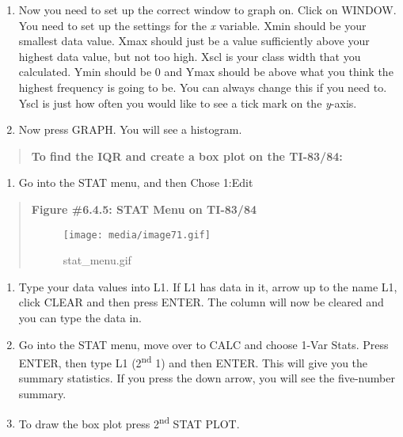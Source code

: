 \documentclass[]{book}
\providecommand{\tightlist}{%
  \setlength{\itemsep}{0pt}\setlength{\parskip}{0pt}}
\begin{document}
\begin{enumerate}
\def\labelenumi{\arabic{enumi}.}
\setcounter{enumi}{7}
\item
  Now you need to set up the correct window to graph on. Click on
  WINDOW. You need to set up the settings for the \emph{x} variable. Xmin
  should be your smallest data value. Xmax should just be a value
  sufficiently above your highest data value, but not too high. Xscl
  is your class width that you calculated. Ymin should be 0 and Ymax
  should be above what you think the highest frequency is going to be.
  You can always change this if you need to. Yscl is just how often
  you would like to see a tick mark on the \emph{y}-axis.
\item
  Now press GRAPH. You will see a histogram.
\end{enumerate}

\begin{quote}
\textbf{To find the IQR and create a box plot on the TI-83/84:}
\end{quote}

\begin{enumerate}
\def\labelenumi{\arabic{enumi}.}
\tightlist
\item
  Go into the STAT menu, and then Chose 1:Edit
\end{enumerate}

\begin{quote}
\textbf{Figure \#6.4.5: STAT Menu on TI-83/84}

\begin{figure}
\centering
\texttt{[image: media/image71.gif]}
\caption{stat\_menu.gif}
\end{figure}
\end{quote}

\begin{enumerate}
\def\labelenumi{\arabic{enumi}.}
\setcounter{enumi}{1}
\item
  Type your data values into L1. If L1 has data in it, arrow up to the
  name L1, click CLEAR and then press ENTER. The column will now be
  cleared and you can type the data in.
\item
  Go into the STAT menu, move over to CALC and choose 1-Var Stats.
  Press ENTER, then type L1 (2\textsuperscript{nd} 1) and then ENTER. This will give
  you the summary statistics. If you press the down arrow, you will
  see the five-number summary.
\item
  To draw the box plot press 2\textsuperscript{nd} STAT PLOT.
\end{enumerate}
\end{document}
